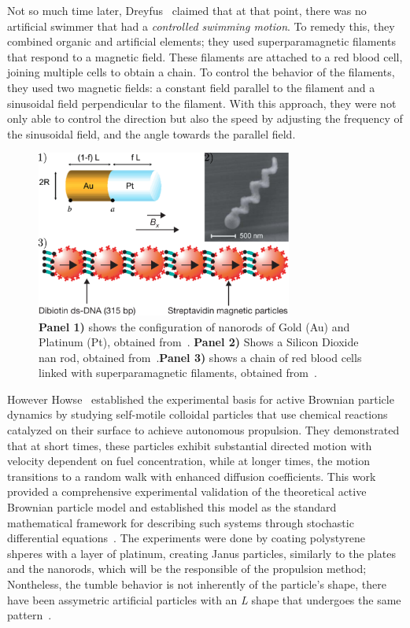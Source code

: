 Not so much time later, Dreyfus~\cite{dreyfus2005microscopic} claimed that at that point, there was no artificial swimmer that had a \textit{controlled swimming motion}. To remedy this, they combined organic and artificial elements; they used superparamagnetic filaments that respond to a magnetic field. These filaments are attached to a red blood cell, joining multiple cells to obtain a chain. To control the behavior of the filaments, they used two magnetic fields: a constant field parallel to the filament and a sinusoidal field perpendicular to the filament. With this approach, they were not only able to control the direction but also the speed by adjusting the frequency of the sinusoidal field, and the angle towards the parallel field.

\begin{figure}
  \begin{center}
    \includegraphics[width=0.75\textwidth]{figures/artificialExamples.pdf}
  \end{center}
  \caption[Artificail microswimmers]{\textbf{Panel 1)} shows the configuration of nanorods of Gold (Au) and Platinum (Pt), obtained from~\cite{paxton2004catalytic}. \textbf{Panel 2)} Shows a Silicon Dioxide nan rod, obtained from~\cite{ghosh2009controlled}.\textbf{Panel 3)} shows a chain of red blood cells linked with superparamagnetic filaments, obtained from~\cite{dreyfus2005microscopic}.}\label{fig:artificialexamples}
\end{figure}


However Howse~\cite{howse2007self} established the experimental basis for active Brownian particle dynamics by studying self-motile colloidal particles that use chemical reactions catalyzed on their surface to achieve autonomous propulsion. They demonstrated that at short times, these particles exhibit substantial directed motion with velocity dependent on fuel concentration, while at longer times, the motion transitions to a random walk with enhanced diffusion coefficients. This work provided a comprehensive experimental validation of the theoretical active Brownian particle model and established this model as the standard mathematical framework for describing such systems through stochastic differential equations~\cite{palacci2010sedimentation}. The experiments were done by coating polystyrene shperes with a layer of platinum, creating Janus particles, similarly to the plates and the nanorods, which will be the responsible of the propulsion method; Nontheless, the tumble behavior is not inherently of the particle's shape, there have been assymetric artificial particles with an \textit{L} shape that undergoes the same pattern~\cite{kummel2013circular}.

